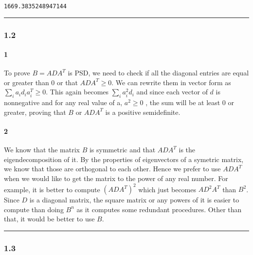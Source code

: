 \documentclass[11pt]{article}
\begin{document}
    \begin{Verbatim}[commandchars=\\\{\}]
1669.3835248947144

    \end{Verbatim}

    \begin{center}\rule{0.5\linewidth}{\linethickness}\end{center}

    \hypertarget{section}{%
\subsubsection{1.2}\label{section}}

    \hypertarget{section}{%
\paragraph{1}\label{section}}

    To prove \(B = ADA^T\) is PSD, we need to check if all the diagonal
entries are equal or greater than 0 or that \(ADA^T \geq 0\). We can
rewrite them in vector form as \(\sum_i a_id_ia_i^T \geq 0\). This again
becomes \(\sum_i a_i^2d_i\) and since each vector of \(d\) is
nonnegative and for any real value of a, \(a^2 \geq 0\) , the sum will
be at least 0 or greater, proving that \(B\) or \(ADA^T\) is a positive
semidefinite.

    \hypertarget{section}{%
\paragraph{2}\label{section}}

    We know that the matrix \(B\) is symmetric and that \(ADA^T\) is the
eigendecomposition of it. By the properties of eigenvectors of a
symetric matrix, we know that those are orthogonal to each other. Hence
we prefer to use \(ADA^T\) when we would like to get the matrix to the
power of any real number. For example, it is better to compute
\((ADA^T)^2\) which just becomes \(AD^2A^T\) than \(B^2\). Since \(D\)
is a diagonal matrix, the square matrix or any powers of it is easier to
compute than doing \(B^n\) as it computes some redundant procedures.
Other than that, it would be better to use \(B\).

    \begin{center}\rule{0.5\linewidth}{\linethickness}\end{center}

    \hypertarget{section}{%
\subsubsection{1.3}\label{section}}
\end{document}
